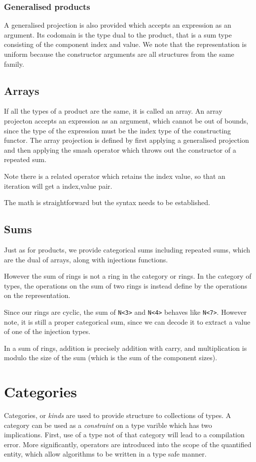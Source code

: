 \documentclass[oneside]{book}
\theoremstyle{plain}
\theoremstyle{definition}
\theoremstyle{plain}
\begin{document}
\subsection{Generalised products}
A generalised projection is also provided which accepts an
expression as an argument. Its codomain is the type dual
to the product, that is a sum type consisting of the component
index and value.  We note that the representation is uniform because
the constructor arguments are all structures from the same family.

\section{Arrays}
If all the types of a product are the same, it is called an array.
An array projecton accepts an expression as an argument, which cannot
be out of bounds, since the type of the expression must be the index
type of the constructing functor. The array projection is defined by
first applying a generalised projection and then applying the smash 
operator which throws out the constructor of a repeated sum.

Note there is a related operator which retains the index value,
so that an iteration will get a index,value pair.

The math is straightforward but the syntax needs to be established.

\section{Sums}
Just as for products, we provide categorical sums including
repeated sums, which are the dual of arrays, along with 
injections functions.

However the sum of rings is not a ring in the category or rings.
In the category of types, the operations on the sum of two rings
is instead define by the operations on the representation.

Since our rings are cyclic, the sum of \verb$N<3>$ and \verb$N<4>$ behaves like
\verb$N<7>$. However note, it is still a proper categorical sum, since we
can decode it to extract a value of one of the injection types.

In a sum of rings, addition is precisely addition with carry,
and multiplication is modulo the size of the sum (which is the
sum of the component sizes).

\chapter{Categories}
Categories, or {\em kinds} are used to provide structure to collections of types.
A category can be used as a {\em constraint} on a type varible which has two
implications. First, use of a type not of that category will lead to a compilation
error. More significantly, operators are introduced into the scope of the quantified
entity, which allow algorithms to be written in a type safe manner.
\end{document}
